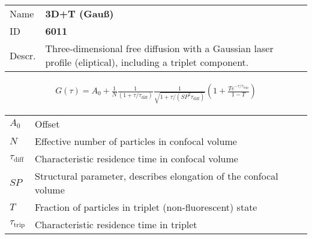 \noindent \begin{tabular}{lp{}}
Name & \textbf{3D+T (Gauß)} \\ 
ID & \textbf{6011} \\ 
Descr. &  Three-dimensional free diffusion with a Gaussian laser profile (eliptical), including a triplet component. \\ 
\end{tabular}
\begin{align}
G(\tau) = A_0 + \frac{1}{N} \frac{1}{(1+\tau/\tau_\mathrm{diff})} \frac{1}{\sqrt{1+\tau/(\mathit{SP}^2 \tau_\mathrm{diff})}} \left(1 + \frac{T e^{-\tau/\tau_\mathrm{trip}}}{1-T}  \right)
\end{align} 
\begin{center}
\begin{tabular}{ll}
$A_0$ & Offset \\ 
$N$ & Effective number of particles in confocal volume \\ 
$\tau_\mathrm{diff}$ &  Characteristic residence time in confocal volume \\ 
$\mathit{SP}$ & Structural parameter, describes elongation of the confocal volume \\
$T$ &  Fraction of particles in triplet (non-fluorescent) state\\ 
$\tau_\mathrm{trip}$ &  Characteristic residence time in triplet \\
\end{tabular}
\end{center}
\vspace{2em}


